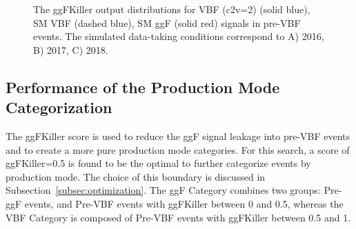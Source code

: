 \begin{figure}[htbp!]
\captionsetup[subfigure]{justification=centering}
\begin{center}
\end{center}
\caption[The ggFKiller output distributions]{The ggFKiller output distributions for VBF (c2v=2) (solid blue), SM VBF (dashed blue), SM ggF (solid red) signals in pre-VBF events. The simulated data-taking conditions correspond to A) 2016, B) 2017, C) 2018.}
\label{event_selection:fig:ggfkillershape}
\end{figure}

\subsection{Performance of the Production Mode Categorization}
The ggFKiller score is used to reduce the ggF signal leakage into pre-VBF events and to create a more pure production mode categories. For this search, a score of ggFKiller=0.5 is found to be the optimal to further categorize events by production mode. The choice of this boundary is discussed in Subsection~\ref{subsec:optimization}. The ggF Category combines two groups: Pre-ggF events, and Pre-VBF events with ggFKiller between 0 and 0.5, whereas the VBF Category is composed of Pre-VBF events with ggFKiller between 0.5 and 1. 
 
